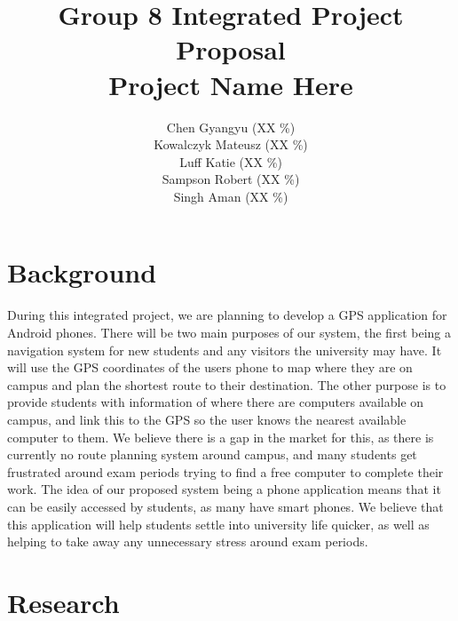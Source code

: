 \documentclass[10pt,a4paper,oneside]{report}
\begin{document}
\title{Group 8 Integrated Project Proposal\\Project Name Here}

\author{
  Chen Gyangyu (XX \%)\\
  Kowalczyk Mateusz (XX \%)\\
  Luff Katie (XX \%)\\
  Sampson Robert (XX \%)\\
  Singh Aman (XX \%)\\ }
\maketitle
\section*{Background}
During this integrated project, we are planning to develop a GPS application for Android phones. There will be two main purposes of our system, the first being a navigation system for new students and any visitors the university may have. It will use the GPS coordinates of the users phone to map where they are on campus and plan the shortest route to their destination. The other purpose is to provide students with information of where there are computers available on campus, and link this to the GPS so the user knows the nearest available computer to them.
We believe there is a gap in the market for this, as there is currently no route planning system around campus, and many students get frustrated around exam periods trying to find a free computer to complete their work. The idea of our proposed system being a phone application means that it can be easily accessed by students, as many have smart phones. We believe that this application will help students settle into university life quicker, as well as helping to take away any unnecessary stress around exam periods.

\section*{Research}
\end{document}
